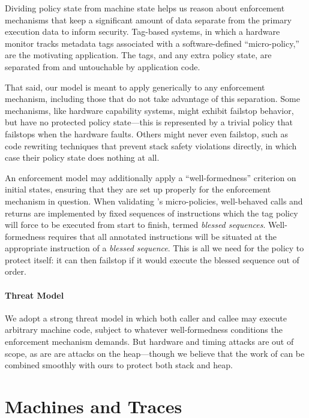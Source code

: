\documentclass[acmsmall,review,anonymous]{acmart}\settopmatter{printfolios=true,printccs=false,printacmref=false}
\begin{document}
{Dividing policy state from machine state helps us reason about
enforcement mechanisms that keep a significant amount of data separate from the
primary execution data to inform security. Tag-based systems, in which a hardware
monitor tracks metadata tags associated with a software-defined ``micro-policy,'' are
the motivating application. The tags, and any extra policy state, are separated from
and untouchable by application code.

That said, our model is meant to apply generically to any enforcement mechanism,
including those that do not take advantage of this separation.
Some mechanisms, like hardware capability systems, might exhibit failstop behavior,
but have no protected policy state---this is represented by a trivial policy
that failstops when the hardware faults. Others might never even failstop, such as
code rewriting techniques that prevent stack safety violations directly, in which
case their policy state does nothing at all.

An enforcement model may additionally
apply a ``well-formedness'' criterion on initial states, ensuring that
they are set up properly for the enforcement mechanism in question.
When validating \citeauthor{DBLP:conf/sp/RoesslerD18}'s micro-policies,
well-behaved calls and returns are implemented by fixed sequences of instructions
which the tag policy will force to be executed from start to finish,
termed {\em blessed sequences}. Well-formedness requires that all annotated
instructions will be situated at the appropriate instruction of a {\em blessed sequence}.
This is all we need for the policy to protect itself: it can then failstop if it would
execute the blessed sequence out of order.

\paragraph*{Threat Model}

We adopt a strong threat model in which both caller and callee may execute
arbitrary machine code, subject to whatever well-formedness conditions the
enforcement mechanism demands. But hardware and timing attacks are out of scope, as are
are attacks on the heap---though we believe that the work of
\citet{DBLP:conf/post/AmorimHP18} can be combined smoothly with ours
to protect both stack and heap.


\section{Machines and Traces}
\label{sec:prelim}

}
\end{document}
